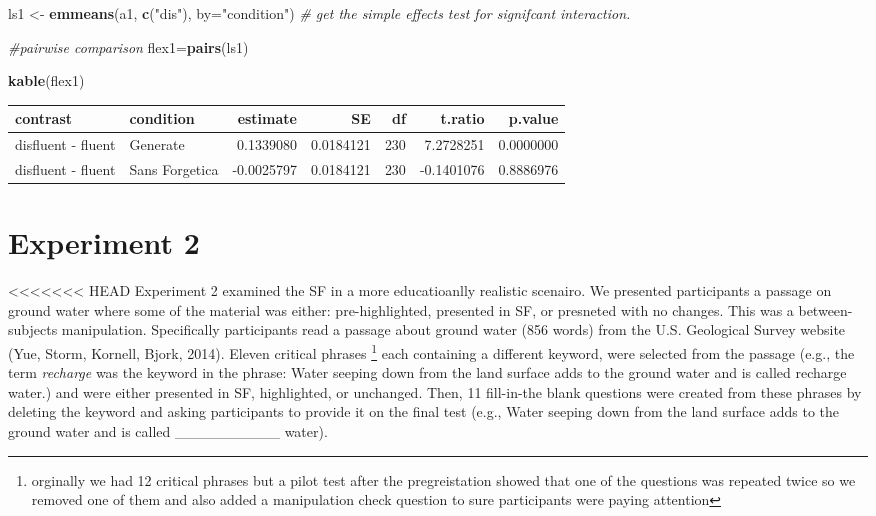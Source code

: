 \documentclass[]{article}
\newenvironment{Shaded}{\begin{snugshade}}{\end{snugshade}}
\newcommand{\CommentTok}[1]{\textcolor[rgb]{0.56,0.35,0.01}{\textit{#1}}}
\newcommand{\DataTypeTok}[1]{\textcolor[rgb]{0.13,0.29,0.53}{#1}}
\newcommand{\KeywordTok}[1]{\textcolor[rgb]{0.13,0.29,0.53}{\textbf{#1}}}
\newcommand{\NormalTok}[1]{#1}
\newcommand{\StringTok}[1]{\textcolor[rgb]{0.31,0.60,0.02}{#1}}
\begin{document}
\begin{Shaded}
\begin{Highlighting}[]
\NormalTok{ls1 <-}\StringTok{ }\KeywordTok{emmeans}\NormalTok{(a1, }\KeywordTok{c}\NormalTok{(}\StringTok{"dis"}\NormalTok{), }\DataTypeTok{by=}\StringTok{"condition"}\NormalTok{) }\CommentTok{# get the simple effects test for signifcant interaction. }

\CommentTok{#pairwise comparison}
\NormalTok{flex1=}\KeywordTok{pairs}\NormalTok{(ls1)}

\KeywordTok{kable}\NormalTok{(flex1)}
\end{Highlighting}
\end{Shaded}

\begin{longtable}[]{@{}llrrrrr@{}}
\toprule
contrast & condition & estimate & SE & df & t.ratio &
p.value\tabularnewline
\midrule
\endhead
disfluent - fluent & Generate & 0.1339080 & 0.0184121 & 230 & 7.2728251
& 0.0000000\tabularnewline
disfluent - fluent & Sans Forgetica & -0.0025797 & 0.0184121 & 230 &
-0.1401076 & 0.8886976\tabularnewline
\bottomrule
\end{longtable}

\hypertarget{experiment-2}{%
\section{Experiment 2}\label{experiment-2}}

\textless{}\textless{}\textless{}\textless{}\textless{}\textless{}\textless{}
HEAD Experiment 2 examined the SF in a more educatioanlly realistic
scenairo. We presented participants a passage on ground water where some
of the material was either: pre-highlighted, presented in SF, or
presneted with no changes. This was a between-subjects manipulation.
Specifically participants read a passage about ground water (856 words)
from the U.S. Geological Survey website (Yue, Storm, Kornell, Bjork,
2014). Eleven critical phrases \footnote{orginally we had 12 critical
  phrases but a pilot test after the pregreistation showed that one of
  the questions was repeated twice so we removed one of them and also
  added a manipulation check question to sure participants were paying
  attention} each containing a different keyword, were selected from the
passage (e.g., the term \emph{recharge} was the keyword in the phrase:
Water seeping down from the land surface adds to the ground water and is
called recharge water.) and were either presented in SF, highlighted, or
unchanged. Then, 11 fill-in-the blank questions were created from these
phrases by deleting the keyword and asking participants to provide it on
the final test (e.g., Water seeping down from the land surface adds to
the ground water and is called \_\_\_\_\_\_\_\_\_\_ water).
\end{document}
